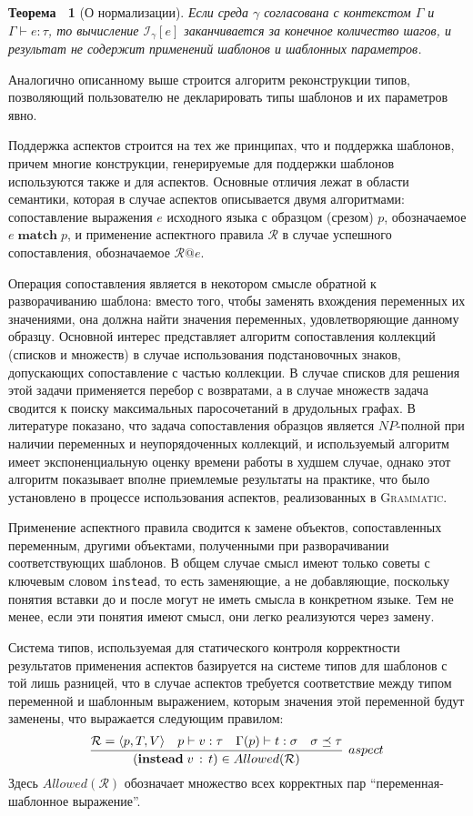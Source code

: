 \documentclass[12pt,a4paper]{article}
\makeatletter
\newcommand{\code}[1]{\mbox{\texttt{#1}}}
\newcommand{\tool}[1]{\textsc{#1}}
\theoremstyle{definition}
\theoremstyle{plain}
\newtheorem{Th}{Теорема~}[part]
\newcommand{\GRM}{\tool{Grammatic}}
\newcommand{\Inst}[2]{\mathcal{I}_{#1} \left[ #2 \right]}%
\newcommand{\match}[2]{#1 \; \mathbf{match} \; #2}
\newcommand{\rapply}[2]{#1@#2}
\makeatother
\begin{document}
\begin{Th}[О нормализации]
Если среда $\gamma$ согласована с контекстом $\Gamma$ и $\Gamma \vdash e : \tau$, то вычисление $\Inst{\gamma}{e}$ заканчивается за конечное количество шагов, и результат не содержит применений шаблонов и шаблонных параметров.
\end{Th}

Аналогично описанному выше строится алгоритм реконструкции типов, позволяющий пользователю не декларировать типы шаблонов и их параметров явно.

Поддержка аспектов строится на тех же принципах, что и поддержка шаблонов, причем многие конструкции, генерируемые для поддержки шаблонов используются также и для аспектов. Основные отличия лежат в области семантики, которая в случае аспектов описывается двумя алгоритмами: сопоставление выражения $e$ исходного языка с образцом (срезом) $p$, обозначаемое $\match{e}{p}$, и применение аспектного правила $\mathcal{R}$ в случае успешного сопоставления, обозначаемое $\rapply{\mathcal{R}}{e}$.

Операция сопоставления является в некотором смысле обратной к разворачиванию шаблона: вместо того, чтобы заменять вхождения переменных их значениями, она должна найти значения переменных, удовлетворяющие данному образцу. Основной интерес представляет алгоритм сопоставления коллекций (списков и множеств) в случае использования подстановочных знаков, допускающих сопоставление с частью коллекции. В случае списков для решения этой задачи применяется перебор с возвратами, а в случае множеств задача сводится к поиску максимальных паросочетаний в друдольных графах. В литературе показано, что задача сопоставления образцов является $NP$-полной при наличии переменных и неупорядоченных коллекций, и используемый алгоритм имеет экспоненциальную оценку времени работы в худшем случае, однако этот алгоритм показывает вполне приемлемые результаты на практике, что было установлено в процессе использования аспектов, реализованных в \GRM{}.

Применение аспектного правила сводится к замене объектов, сопоставленных переменным, другими объектами, полученными при разворачивании соответствующих шаблонов. В общем случае смысл имеют только советы с ключевым словом \code{instead}, то есть заменяющие, а не добавляющие, поскольку понятия вставки до и после могут не иметь смысла в конкретном языке. Тем не менее, если эти понятия имеют смысл, они легко реализуются через замену.

Система типов, используемая для статического контроля корректности результатов применения аспектов базируется на системе типов для шаблонов с той лишь разницей, что в случае аспектов требуется соответствие между типом переменной и шаблонным выражением, которым значения этой переменной будут заменены, что выражается следующим правилом:
$$
	\infer[aspect]{
		(\mathbf{instead} \; v \, : \, t) \in Allowed(\mathcal{R})
	}{
		\mathcal{R} = \langle p, T, V \rangle &
		p \vdash v : \tau &
		\Gamma(p) \vdash t : \sigma &
		\sigma \preceq \tau
	}
$$
Здесь $Allowed(\mathcal{R})$ обозначает множество всех корректных пар ``переменная-шаблонное выражение''.
\end{document}
